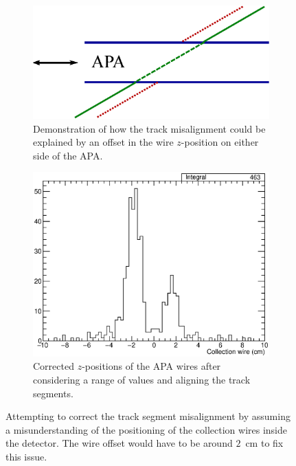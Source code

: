 \begin{figure}
  \centering
  \begin{subfigure}[t]{0.48\linewidth}
    \centering
    \includegraphics[width=\textwidth]{misalign_track_wire_geo.eps}
    \caption{Demonstration of how the track misalignment could be explained by an offset in the wire $z$-position on either side of the APA.}
    \label{fig:TrackMisalignmentZPositionGeo}
  \end{subfigure}
  \hfill
  \begin{subfigure}[t]{0.48\linewidth}
    \centering
    \includegraphics[width=\textwidth]{misalign_track_wire_res.eps}
    \caption{Corrected $z$-positions of the APA wires after considering a range of values and aligning the track segments.}
    \label{fig:TrackMisalignmentZPositionRes}
  \end{subfigure}
  \caption[Attempting to correct the track segment misalignment by assuming a misunderstanding of the positioning of the collection wires inside the detector.]{Attempting to correct the track segment misalignment by assuming a misunderstanding of the positioning of the collection wires inside the detector.  The wire offset would have to be around $2$~cm to fix this issue.}
  \label{fig:TrackMisalignmentZPosition}
\end{figure}

